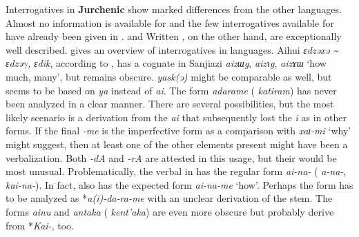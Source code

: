 Interrogatives in \textbf{Jurchenic} show marked differences from the other  languages. Almost no information is available for  and the few interrogatives available for  have already been given in .  and Written , on the other hand, are exceptionally well described.  gives an overview of interrogatives in  languages. Aihui  \textit{ɛdzəxə {\textasciitilde}} \textit{ɛdzə$\gamma $,} \textit{ɛdik}, according to \citet[149]{Enhebatu1995}, has a cognate in Sanjiazi  \textit{aizɯg}, \textit{aizɿg}, \textit{aizɤɯ} ‘how much, many’, but remains obscure.  \textit{yask(}\textit{ə)} might be comparable as well, but seems to be based on \textit{ya} instead of \textit{ai}. The  form \textit{adarame} ( \textit{katiram}) has never been analyzed in a clear manner. There are several possibilities, but the most likely scenario is a derivation from the  \textit{ai} that subsequently lost the \textit{i} as in other forms. If the final \textit{-me} is the imperfective  form as a comparison with  \textit{xaɪ}\textit{-mi} ‘why’ might suggest, then at least one of the other elements present might have been a verbalization. Both \textit{-dA} and \textit{-rA} are attested in this usage, but their  would be most unusual. Problematically, the verbal  in  has the regular form \textit{ai-na-} ( \textit{a-na-},  \textit{kai-na-}). In fact,  also has the expected form \textit{ai-na-me} ‘how’. Perhaps the form has to be analyzed as *\textit{a(i)-da-ra-me} with an unclear derivation of the  stem. The forms \textit{ainu} and \textit{antaka} ( \textit{kent’aka}) are even more obscure but probably derive from *\textit{Kai-}, too.

